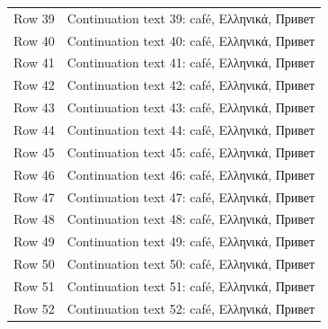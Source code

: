 \documentclass{article}
\begin{document}
\begin{longtable}{>{\raggedright\arraybackslash}p{}>{\raggedright\arraybackslash}p{}}
Row 39\par  & Continuation text 39: café, Ελληνικά, Привет\par  \\
Row 40\par  & Continuation text 40: café, Ελληνικά, Привет\par  \\
Row 41\par  & Continuation text 41: café, Ελληνικά, Привет\par  \\
Row 42\par  & Continuation text 42: café, Ελληνικά, Привет\par  \\
Row 43\par  & Continuation text 43: café, Ελληνικά, Привет\par  \\
Row 44\par  & Continuation text 44: café, Ελληνικά, Привет\par  \\
Row 45\par  & Continuation text 45: café, Ελληνικά, Привет\par  \\
Row 46\par  & Continuation text 46: café, Ελληνικά, Привет\par  \\
Row 47\par  & Continuation text 47: café, Ελληνικά, Привет\par  \\
Row 48\par  & Continuation text 48: café, Ελληνικά, Привет\par  \\
Row 49\par  & Continuation text 49: café, Ελληνικά, Привет\par  \\
Row 50\par  & Continuation text 50: café, Ελληνικά, Привет\par  \\
Row 51\par  & Continuation text 51: café, Ελληνικά, Привет\par  \\
Row 52\par  & Continuation text 52: café, Ελληνικά, Привет\par  \\

\end{longtable}
\end{document}
